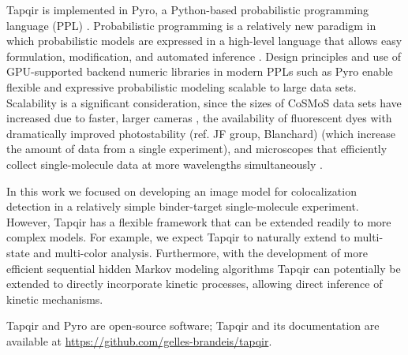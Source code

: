 
Tapqir is implemented in Pyro, a Python-based probabilistic programming language (PPL) \cite{Bingham2019-qy}. Probabilistic programming is a relatively new paradigm in which probabilistic models are expressed in a high-level language that allows easy formulation, modification, and automated inference \cite{Van_de_Meent2018-mi}. Design principles and use of GPU-supported backend numeric libraries in modern PPLs such as Pyro enable flexible and expressive probabilistic modeling scalable to large data sets. Scalability is a significant consideration, since the sizes of CoSMoS data sets have increased due to faster, larger cameras \cite{Quan2011-cg}, the availability of fluorescent dyes with dramatically improved photostability \cite{Grimm2015-ea} (ref. JF group, Blanchard) (which increase the amount of data from a single experiment), and microscopes that efficiently collect single-molecule data at more wavelengths simultaneously \cite{Friedman2006-kb}.


In this work we focused on developing an image model for colocalization detection in a relatively simple binder-target single-molecule experiment. However, Tapqir has a flexible framework that can be extended readily to more complex models. For example, we expect Tapqir to naturally extend to multi-state and multi-color analysis. Furthermore, with the development of more efficient sequential hidden Markov modeling algorithms \cite{Sarkka2019-jw,Obermeyer2019-pp} Tapqir can potentially be extended to directly incorporate kinetic processes, allowing direct inference of kinetic mechanisms.

Tapqir and Pyro are open-source software; Tapqir and its documentation are available at \url{https://github.com/gelles-brandeis/tapqir}.

